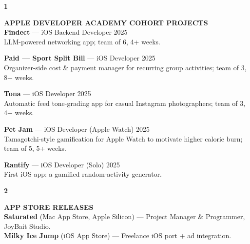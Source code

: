 \documentclass[11pt,a4paper]{article}
\begin{document}
\hspace{1cm}
\begin{minipage}[t]{18cm}

\begin{minipage}[t]{0.8cm}
{\Large\bfseries 1}
\end{minipage}%
\begin{minipage}[t]{17cm}
{\large\bfseries APPLE DEVELOPER ACADEMY COHORT PROJECTS}\\[8pt]

\textbf{Findect} — iOS Backend Developer \textbar{} 2025\\
{\small LLM-powered networking app; team of 6, 4+ weeks.}

\vspace{0.2cm}

\textbf{Paid — Sport Split Bill} — iOS Developer \textbar{} 2025\\
{\small Organizer-side cost \& payment manager for recurring group activities; team of 3, 8+ weeks.}

\vspace{0.2cm}

\textbf{Tona} — iOS Developer \textbar{} 2025\\
{\small Automatic feed tone-grading app for casual Instagram photographers; team of 3, 4+ weeks.}

\vspace{0.2cm}

\textbf{Pet Jam} — iOS Developer (Apple Watch) \textbar{} 2025\\
{\small Tamagotchi-style gamification for Apple Watch to motivate higher calorie burn; team of 5, 5+ weeks.}

\vspace{0.2cm}

\textbf{Rantify} — iOS Developer (Solo) \textbar{} 2025\\
{\small First iOS app: a gamified random-activity generator.}

\end{minipage}

\vspace{0.6cm}

\begin{minipage}[t]{0.8cm}
{\Large\bfseries 2}
\end{minipage}%
\begin{minipage}[t]{17cm}
{\large\bfseries APP STORE RELEASES}\\[8pt]

\textbf{Saturated} (Mac App Store, Apple Silicon) — Project Manager \& Programmer, JoyBait Studio.\\
\textbf{Milky Ice Jump} (iOS App Store) — Freelance iOS port + ad integration.


\end{minipage}
\end{minipage}
\end{document}
